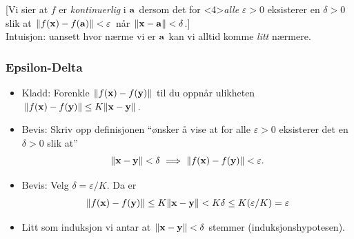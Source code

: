 \begin{frame}
{  }
[Vi sier at $f$ er \emph{kontinuerlig} i $\mathbf{a}$ dersom det for <4>{\emph{alle}} $\varepsilon >
0$ eksisterer en $\delta > 0$ slik at
%
$
  \lVert f(\mathbf{x}) - f(\mathbf{a})\rVert < \varepsilon$ når $\lVert\mathbf{x} - \mathbf{a}\rVert < \delta
  $.]\\
  Intuisjon: uansett hvor nærme vi er $\mathbf{a}$ kan vi alltid komme \emph{litt} nærmere.
\end{frame}

\begin{frame}
  \frametitle{Epsilon-Delta}
  \begin{itemize}
    \item Kladd: Forenkle $\lVert f(\mathbf{x}) - f(\mathbf{y})\rVert$ til du oppnår ulikheten
      $\lVert f(\mathbf{x})-f(\mathbf{y})\rVert \leq K \lVert\mathbf{x} - \mathbf{y}\rVert$.
    \item Bevis: Skriv opp definisjonen ``ønsker å vise at for alle
      $\varepsilon>0$ eksisterer det en $\delta>0$ slik at''
      \begin{equation*}
    \norm{\X - \Y} < \delta \ \Longrightarrow \ \norm{f(\X) - f(\Y)} < \varepsilon.
  \end{equation*}
    \item Bevis: Velg $\delta = \varepsilon/K$. Da er
      \begin{align*}
        \lVert f(\mathbf{x}) - f(\mathbf{y})\rVert \leq K \lVert\mathbf{x} - \mathbf{y}\rVert < K \delta \leq K(\varepsilon/K) = \varepsilon
      \end{align*}
    \item Litt som induksjon vi antar at $\lVert\mathbf{x}-\mathbf{y}\rVert<\delta$ stemmer (induksjonshypotesen).
  \end{itemize}
\end{frame}

